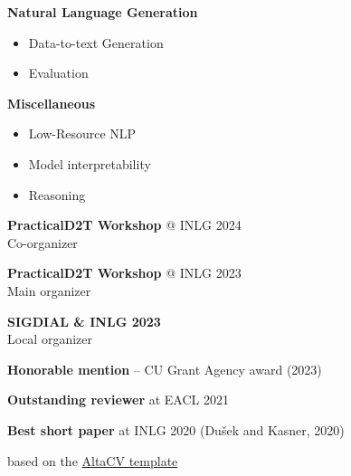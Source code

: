 



\begin{description}[font=\color{accent},style=multiline,leftmargin=1.35em]
    \item[\normalfont\faComment] \textbf{Natural Language Generation} 
    \begin{itemize}
        \item Data-to-text Generation
        \item Evaluation
    \end{itemize} 
    \item[\normalfont\faFlask] \textbf{Miscellaneous}
    \begin{itemize}
        \item Low-Resource NLP
        \item Model interpretability
        \item Reasoning
    \end{itemize} 
\end{description}


\begin{description}[font=\color{accent},style=multiline,leftmargin=1.35em]
    \item[\normalfont\faCircle] \textbf{PracticalD2T Workshop} @ INLG 2024 \\
    Co-organizer
    \item[\normalfont\faCircle] \textbf{PracticalD2T Workshop} @ INLG 2023 \\
        Main organizer
    \item[\normalfont\faCircle] \textbf{SIGDIAL \& INLG 2023} \\
    Local organizer
\end{description}


\begin{description}[font=\color{accent},style=multiline,leftmargin=1.35em]
    \item[\normalfont\faMoney] \textbf{Honorable mention} -- CU Grant Agency award (2023) 
    \item[\normalfont\faComments] \textbf{Outstanding reviewer} at EACL 2021
    \item[\normalfont\faTrophy] \textbf{Best short paper} at INLG 2020 (Dušek and Kasner, 2020)
\end{description}







\vspace{7cm}
\flushright  \scriptsize \color{LightGrey} based on the \href{https://github.com/liantze/AltaCV}{AltaCV template}